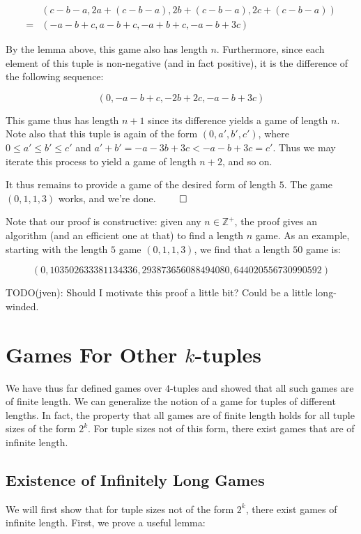 \documentclass[12pt]{amsart}
\newcommand{\zp}{\mathbb{Z}^+}
\begin{document}
$$\begin{array}{cl}
& (c - b - a, 2a + (c - b - a), 2b + (c - b - a), 2c + (c - b - a)) \\
= & (-a - b + c, a - b + c, -a + b + c, -a - b + 3c)
\end{array}$$

By the lemma above, this game also has length $n$. Furthermore, since each element of this tuple is non-negative (and in fact positive), it is the difference of the following sequence:

$$(0, -a - b + c, -2b + 2c, -a - b + 3c)$$

This game thus has length $n + 1$ since its difference yields a game of length $n$. Note also that this tuple is again of the form $(0, a', b', c')$, where $0\leq a'\leq b'\leq c'$ and $a' + b' = -a - 3b + 3c < -a - b + 3c = c'$. Thus we may iterate this process to yield a game of length $n + 2$, and so on.

It thus remains to provide a game of the desired form of length $5$. The game $(0, 1, 1, 3)$ works, and we're done. $\qed$

Note that our proof is constructive: given any $n\in \zp$, the proof gives an algorithm (and an efficient one at that) to find a length $n$ game. As an example, starting with the length $5$ game $(0, 1, 1, 3)$, we find that a length $50$ game is:

$$(0, 103502633381134336, 293873656088494080, 644020556730990592)$$

TODO(jven): Should I motivate this proof a little bit? Could be a little long-winded.

\section{Games For Other $k$-tuples\label{sec:othertuples}}

We have thus far defined games over $4$-tuples and showed that all such games are of finite length. We can generalize the notion of a game for tuples of different lengths. In fact, the property that all games are of finite length holds for all tuple sizes of the form $2^k$. For tuple sizes not of this form, there exist games that are of infinite length.

\subsection{Existence of Infinitely Long Games}

We will first show that for tuple sizes not of the form $2^k$, there exist games of infinite length. First, we prove a useful lemma:
\end{document}

